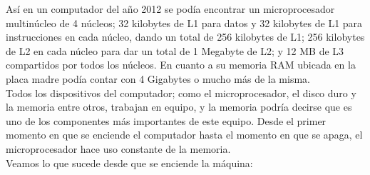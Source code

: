 \documentclass{article}
\begin{document}
Así en un computador del año 2012 se podía encontrar un microprocesador multinúcleo de 4
núcleos; 32 kilobytes de L1 para datos y 32 kilobytes de L1 para instrucciones en cada núcleo,
dando un total de 256 kilobytes de L1; 256 kilobytes de L2 en cada núcleo para dar un total de
1 Megabyte de L2; y 12 MB de L3 compartidos por todos los núcleos. En cuanto a su memoria
RAM ubicada en la placa madre podía contar con 4 Gigabytes o mucho más de la misma.\\[0.1cm]
Todos los dispositivos del computador; como el microprocesador, el disco duro y la memoria
entre otros, trabajan en equipo, y la memoria podría decirse que es uno de los componentes
más importantes de este equipo. Desde el primer momento en que se enciende el computador
hasta el momento en que se apaga, el microprocesador hace uso constante de la memoria.\\[0.1cm]
Veamos lo que sucede desde que se enciende la máquina:
\end{document}
